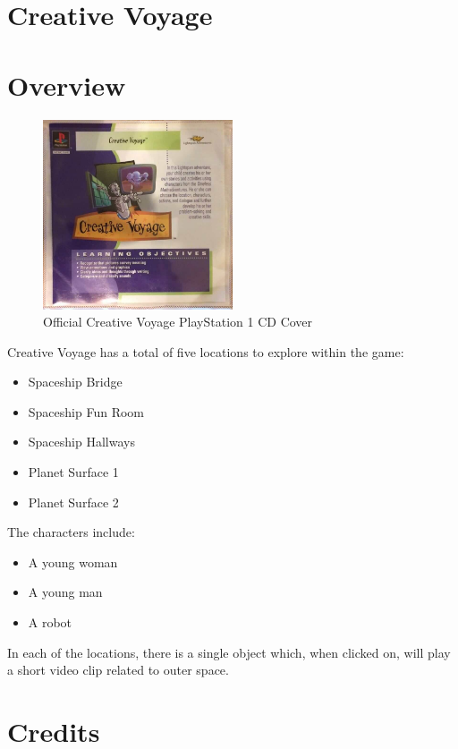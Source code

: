 \section{Creative Voyage}

\section{Overview}

\begin{figure}[H]
    \centering
    \includegraphics[width=0.5\textwidth]{"./Games/Creative/Images/CreativeVoyageCDCover.jpg"}
    \caption{Official Creative Voyage PlayStation 1 CD Cover}
\end{figure}

Creative Voyage has a total of five locations to explore within the game:

\begin{itemize}
    \item Spaceship Bridge
    \item Spaceship Fun Room
    \item Spaceship Hallways
    \item Planet Surface 1
    \item Planet Surface 2
\end{itemize}

The characters include:
\begin{itemize}
    \item A young woman
    \item A young man
    \item A robot
\end{itemize}

In each of the locations, there is a single object which, when clicked on, will play a short video clip related to outer space.

\section{Credits}

